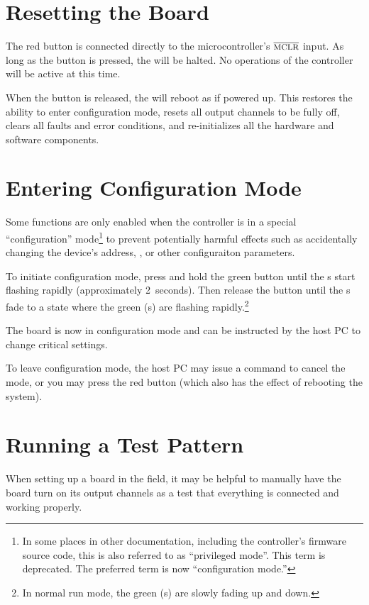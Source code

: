 \documentclass[letterpaper,twoside,onecolumn,openright,final]{memoir}
\begin{document}
\section{Resetting the Board}
The red  button is connected directly to the microcontroller's $\overline{\hbox{\mc{MCLR}}}$ input.
As long as the button is pressed, the  will be halted.  No operations of the controller
will be active at this time.  

When the button is released, the  will reboot as if powered up.  This restores the ability
to enter configuration mode, resets all output channels to be fully off, 
clears all faults and error conditions, and re-initializes all the hardware
and software components.

\section{Entering Configuration Mode}\label{sec:configmode}
Some functions are only enabled when the controller is in a special ``configuration'' mode\footnote{In
some places in other documentation, including the controller's firmware source code, this is also
referred to as ``privileged mode''.  This term is deprecated. The preferred term is now
``configuration mode.''} to prevent potentially harmful effects such as accidentally changing
the device's address, , or other configuraiton parameters.

To initiate configuration mode, press and hold the green  button until the s start
flashing rapidly (approximately 2~seconds).  Then release the  button until the s
fade to a state where the green (s) are flashing rapidly.\footnote{In normal run mode,
the green (s) are slowly fading up and down.}

The board is now in configuration mode and can be instructed by the host PC to change critical
settings.

To leave configuration mode, the host PC may issue a command to cancel the mode, or you may press
the red  button (which also has the effect of rebooting the system).

\section{Running a Test Pattern}
When setting up a board in the field, it may be helpful to manually have the board turn on its
output channels as a test that everything is connected and working properly.
\end{document}
